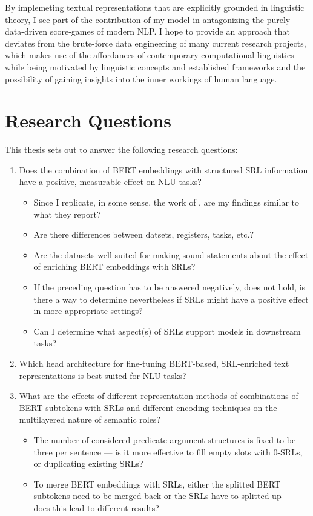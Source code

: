 By implemeting textual representations that are explicitly grounded in linguistic theory, I
see part of the contribution of my model in antagonizing the purely data-driven score-games of
modern NLP. I hope to provide an approach that deviates from the brute-force data engineering of
many current research projects, which makes use of the affordances of contemporary computational
linguistics while being motivated by linguistic concepts and established frameworks and the
possibility of gaining insights into the inner workings of human language.


\section{Research Questions}

This thesis sets out to answer the following research questions:

\begin{enumerate}
  \item \label{ques:one} Does the combination of  BERT embeddings with structured SRL information have a positive,
                         measurable effect on NLU tasks?
    \begin{itemize}
      \item Since I replicate, in some sense, the work of \cite{zhang2019semantics}, are my findings similar to what they report?
      \item Are there differences between datsets, registers, tasks, etc.?
      \item Are the datasets well-suited for making sound statements about the effect of enriching BERT embeddings with SRLs?
      \item If the preceding question has to be answered negatively, does not hold, is there a way to determine nevertheless if SRLs might have a positive effect in more appropriate settings?
      \item Can I determine what aspect(s) of SRLs support models in downstream tasks?
    \end{itemize}
  \item \label{ques:two} Which head architecture for fine-tuning BERT-based, SRL-enriched text representations is best suited for
                          NLU tasks?
  \item \label{ques:three} What are the effects of different representation methods of combinations of BERT-subtokens with SRLs and different encoding techniques on the multilayered nature of semantic roles?
    \begin{itemize}
      \item The number of considered predicate-argument
            structures is fixed to be three per sentence --- is it more effective to fill empty slots with
            0-SRLs, or duplicating existing SRLs?
      \item To merge BERT embeddings with SRLs, either
            the splitted BERT subtokens need to be merged back or the SRLs have to splitted up --- does
            this lead to different results?
    \end{itemize}

\end{enumerate}



